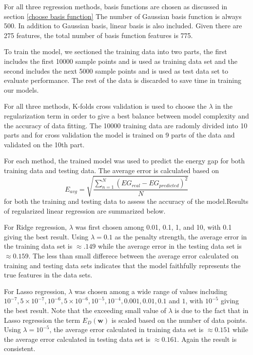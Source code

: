 \documentclass[11pt]{article}
\begin{document}
For all three regression methods, basis functions are chosen as discussed in section \ref{choose basis function} The number of Gaussian basis function is always 500. In addition to Gaussian basis, linear basis is also included. Given there are 275 features, the total number of basis function features is 775. 

To train the model, we sectioned the training data into two parts, the first includes the first 10000 sample points and is used as training data set and the second includes the next 5000 sample points and is used as test data set to evaluate performance. The rest of the data is discarded to save time in training our models. 

For all three methods, K-folds cross validation is used to choose the $\lambda$ in the regularization term in order to give a best balance between model complexity and the accuracy of data fitting. The 10000 training data are radomly divided into 10 parts and for cross validation the model is trained on 9 parts of the data and validated on the 10th part.

For each method, the trained model was used to predict the energy gap for both training data and testing data. The average error is calculated based on
$$E_{avg} = \sqrt{\frac{\sum_{n = 1}^{N}(EG_{real} - EG_{predicted})^2}{N}}$$
for both the training and testing data to assess the accuracy of the model.Results of regularized linear regression are summarized below.

For Ridge regression, $\lambda$ was first chosen among 0.01, 0.1, 1, and 10, with 0.1 giving the best result. Using $\lambda = 0.1$ as the penalty strength, the average error in the training data set is $\approx .149$ while the average error in the testing data set is $\approx 0.159$. The less than small differece between the average error calculated on training and testing data sets indicates that the model faithfully represents the true features in the data sets.

For Lasso regression, $ \lambda $ was chosen among a wide range of values including $ 10^{-7}, 5\times 10^{-7}, 10^{-6}, 5\times 10^{-6}, 10^{-5}, 10^{-4}, 0.001, 0.01, 0.1$ and $1$, with $10^{-5}$ giving the best result. Note that the exceeding small value of $\lambda$ is due to the fact that in Lasso regression the term $E_D(\textbf{w})$ is scaled based on the number of data points. Using $\lambda = 10^{-5}$, the average error calculated in training data set is $\approx 0.151$ while the average error calculated in testing data set is $\approx 0.161$. Again the result is consistent.
\end{document}
